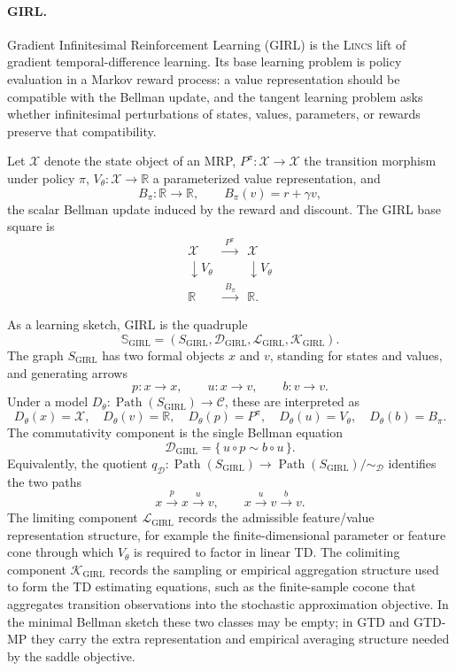 \documentclass{article}
\newcommand{\C}{\mathcal{C}}
\newcommand{\R}{\mathbb{R}}
\newcommand{\Path}{\operatorname{Path}}
\begin{document}
\paragraph{GIRL.}
Gradient Infinitesimal Reinforcement Learning (GIRL) is the \textsc{Lincs}   lift of gradient temporal-difference learning. Its base learning problem is policy evaluation in a Markov reward process: a value representation should be compatible with the Bellman update, and the tangent learning problem asks whether infinitesimal perturbations of states, values, parameters, or rewards preserve that compatibility.

Let \(\mathcal X\) denote the state object of an MRP, \(P^\pi:\mathcal X\to\mathcal X\) the transition morphism under policy \(\pi\), \(V_\theta:\mathcal X\to\R\) a parameterized value representation, and
\[
B_\pi:\R\to\R,
\qquad
B_\pi(v)=r+\gamma v,
\]
the scalar Bellman update induced by the reward and discount. The GIRL base square is
\[
\begin{array}{ccc}
\mathcal X & \xrightarrow{\ P^\pi\ } & \mathcal X\\
\downarrow V_\theta && \downarrow V_\theta\\
\R & \xrightarrow{\ B_\pi\ } & \R .
\end{array}
\]

As a learning sketch, GIRL is the quadruple
\[
\mathbb S_{\mathrm{GIRL}}
  =
  (S_{\mathrm{GIRL}},
   \mathcal D_{\mathrm{GIRL}},
   \mathcal L_{\mathrm{GIRL}},
   \mathcal K_{\mathrm{GIRL}}).
\]
The graph \(S_{\mathrm{GIRL}}\) has two formal objects \(x\) and \(v\), standing for states and values, and generating arrows
\[
p:x\to x,
\qquad
u:x\to v,
\qquad
b:v\to v.
\]
Under a model \(D_\theta:\Path(S_{\mathrm{GIRL}})\to\C\), these are interpreted as
\[
D_\theta(x)=\mathcal X,\quad
D_\theta(v)=\R,\quad
D_\theta(p)=P^\pi,\quad
D_\theta(u)=V_\theta,\quad
D_\theta(b)=B_\pi.
\]
The commutativity component is the single Bellman equation
\[
\mathcal D_{\mathrm{GIRL}}
  =
  \{\,u\circ p \sim b\circ u\,\}.
\]
Equivalently, the quotient \(q_{\mathcal D}:\Path(S_{\mathrm{GIRL}})\to
\Path(S_{\mathrm{GIRL}})/{\sim_{\mathcal D}}\) identifies the two paths
\[
x\xrightarrow{p}x\xrightarrow{u}v,
\qquad
x\xrightarrow{u}v\xrightarrow{b}v.
\]
The limiting component \(\mathcal L_{\mathrm{GIRL}}\) records the admissible feature/value representation structure, for example the finite-dimensional parameter or feature cone through which \(V_\theta\) is required to factor in linear TD. The colimiting component \(\mathcal K_{\mathrm{GIRL}}\) records the sampling or empirical aggregation structure used to form the TD estimating equations, such as the finite-sample cocone that aggregates transition observations into the stochastic approximation objective. In the minimal Bellman sketch these two classes may be empty; in GTD and GTD-MP they carry the extra representation and empirical averaging structure needed by the saddle objective.
\end{document}
